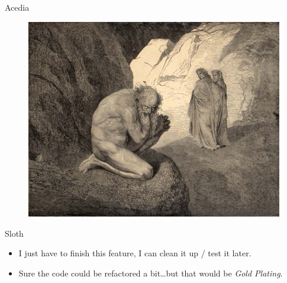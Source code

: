 \documentclass[12pt,xcolor=x11names]{beamer}
\begin{document}
\begin{frame}{Acedia}
    \begin{figure}
        \centering \includegraphics[height=0.75\textheight]{sloth.jpg}
    \end{figure}
\end{frame}
\begin{frame}{Sloth}
    \begin{itemize}
        \item I just have to finish this feature, I can clean it up / test it
            later.
        \item Sure the code could be refactored a bit\ldots but that would be
            \emph{Gold Plating}.
    \end{itemize}
\end{frame}
\end{document}
